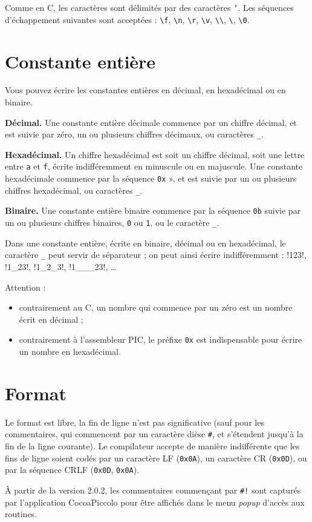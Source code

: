 Comme en C, les caractères sont délimités par des caractères \texttt{'}.  Les séquences d’échappement suivantes sont acceptées : \texttt{\textbackslash f}, \texttt{\textbackslash n}, \texttt{\textbackslash r}, \texttt{\textbackslash v}, \texttt{\textbackslash\textbackslash}, \texttt{\textbackslash\textquotesingle}, \texttt{\textbackslash0}.

\section{Constante entière}

Vous pouvez écrire les constantes entières en décimal, en hexadécimal ou en binaire. 

\textbf{Décimal.} Une constante entière décimale commence par un chiffre décimal, et est suivie par zéro, un ou plusieurs chiffres décimaux, ou caractères \texttt{\_}.

\textbf{Hexadécimal.} Un chiffre hexadécimal est soit un chiffre décimal, soit une lettre entre \texttt{a} et \texttt{f}, écrite indifféremment en minuscule ou en majuscule. Une constante hexadécimale commence par la séquence \texttt{0x} », et est suivie par un ou plusieurs chiffres hexadécimal, ou caractères \texttt{\_}.

\textbf{Binaire.} Une constante entière binaire commence par la séquence \texttt{0b} suivie par un ou plusieurs chiffres binaires, \texttt{0} ou \texttt{1}, ou le caractère \texttt{\_}.

Dans une constante entière, écrite en binaire, décimal ou en hexadécimal, le caractère \texttt{\_} peut servir de séparateur ; on peut ainsi écrire indifféremment : \pic!123!, \pic!1_23!, \pic!1_2_3!, \pic!1___23!, \dots

Attention :
\begin{itemize}
  \item contrairement au C, un nombre qui commence par un zéro est un nombre écrit en décimal ;
  \item contrairement à l’assembleur PIC, le préfixe \texttt{0x} est indispensable pour écrire un nombre en hexadécimal.
\end{itemize}

\section{Format}

Le format est libre, la fin de ligne n’est pas significative (sauf pour les commentaires, qui commencent par un caractère dièse \texttt{\#}, et s’étendent jusqu’à la fin de la ligne courante). Le compilateur accepte de manière indifférente que les fins de ligne soient codés par un caractère LF (\texttt{0x0A}), un caractère CR (\texttt{0x0D}), ou par la séquence CRLF (\texttt{0x0D}, \texttt{0x0A}).

À partir de la version 2.0.2, les commentaires commençant par \texttt{\#!} sont capturés par l'application CocoaPiccolo pour être affichés dans le menu \emph{popup} d'accès aux routines.

